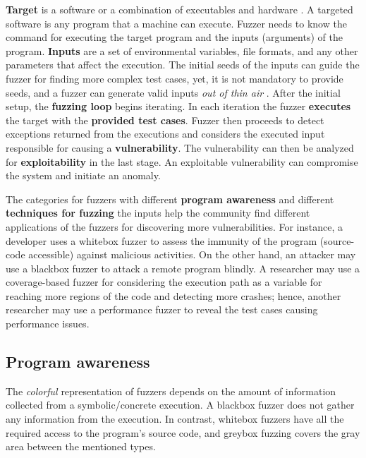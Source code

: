 \textbf{Target} is a software or a combination of executables and hardware \cite{song2019periscope}. A targeted software is any program that a machine can execute. Fuzzer needs to know the command for executing the target program and the inputs (arguments) of the program. \textbf{Inputs} are a set of environmental variables, file formats, and any other parameters that affect the execution. The initial seeds of the inputs can guide the fuzzer for finding more complex test cases, yet, it is not mandatory to provide seeds, and a fuzzer can generate valid inputs \textit{out of thin air} \cite{out_of_thin_air}. After the initial setup, the \textbf{fuzzing loop} begins iterating. In each iteration the fuzzer \textbf{executes} the target with the \textbf{provided test cases}. Fuzzer then proceeds to detect exceptions returned from the executions and considers the executed input responsible for causing a \textbf{vulnerability}. The vulnerability can then be analyzed for \textbf{exploitability} in the last stage. An exploitable vulnerability can compromise the system and initiate an anomaly.

The categories for fuzzers with different \textbf{program awareness} and different \textbf{techniques for fuzzing} the inputs help the community find different applications of the fuzzers for discovering more vulnerabilities. For instance, a developer uses a whitebox fuzzer to assess the immunity of the program (source-code accessible) against malicious activities. On the other hand, an attacker may use a blackbox fuzzer to attack a remote program blindly. A researcher may use a coverage-based fuzzer for considering the execution path as a variable for reaching more regions of the code and detecting more crashes; hence, another researcher may use a performance fuzzer to reveal the test cases causing performance issues. 

\subsection{Program awareness}


The \textit{colorful} representation of fuzzers depends on the amount of information collected from a symbolic/concrete execution. A blackbox fuzzer does not gather any information from the execution. In contrast, whitebox fuzzers have all the required access to the program's source code, and greybox fuzzing covers the gray area between the mentioned types.

